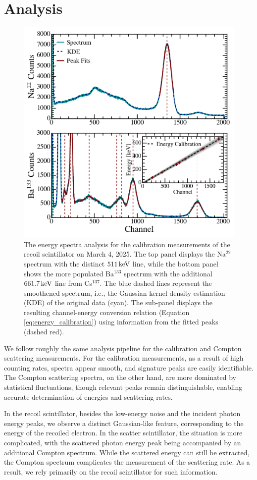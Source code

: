 \documentclass[aps,twocolumn,secnumarabic,balancelastpage,amsmath,amssymb,nofootinbib,floatfix]{revtex4-1}
\newcommand{\keV}{\,{\rm keV}}
\begin{document}
\section{Analysis}
\label{sec:analysis}

\begin{figure}
    \centering
    \includegraphics[width=0.49 \textwidth]{Figures/energy_calibration.png}
    \caption{The energy spectra analysis for the calibration measurements of the recoil scintillator on March 4, 2025. The top panel displays the Na$^{22}$ spectrum with the distinct $511\keV$ line, while the bottom panel shows the more populated Ba$^{133}$ spectrum with the additional $661.7\keV$ line from Cs$^{137}$. The blue dashed lines represent the smoothened spectrum, i.e., the Gaussian kernel density estimation (KDE) of the original data (cyan). The sub-panel displays the resulting channel-energy conversion relation (Equation \ref{eq:energy_calibration}) using information from the fitted peaks (dashed red).}
    \label{fig:energy_calibration}
\end{figure}

We follow roughly the same analysis pipeline for the calibration and Compton scattering measurements. For the calibration measurements, as a result of high counting rates, spectra appear smooth, and signature peaks are easily identifiable. The Compton scattering spectra, on the other hand, are more dominated by statistical fluctuations, though relevant peaks remain distinguishable, enabling accurate determination of energies and scattering rates.

In the recoil scintillator, besides the low-energy noise and the incident photon energy peaks, we observe a distinct Gaussian-like feature, corresponding to the energy of the recoiled electron. In the scatter scintillator, the situation is more complicated, with the scattered photon energy peak being accompanied by an additional Compton spectrum. While the scattered energy can still be extracted, the Compton spectrum complicates the measurement of the scattering rate. As a result, we rely primarily on the recoil scintillator for such information.
\end{document}
